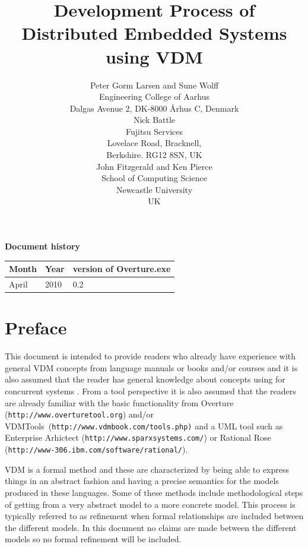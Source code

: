 \documentclass{overturerepchap}
\newcommand{\VDMTools}{VDMTools}
\newcommand{\url}[1]{\texttt{#1}}
\begin{document}
\title{Development Process of Distributed Embedded Systems using VDM}
\author{Peter Gorm Larsen and Sune Wolff \\ 
Engineering College of Aarhus\\
Dalgas Avenue 2, DK-8000 \AA{}rhus C, Denmark\\[3mm]
Nick Battle\\
Fujitsu Services\\
Lovelace Road, Bracknell, \\
Berkshire. RG12 8SN, UK\\[3mm]
John Fitzgerald and Ken Pierce\\
School of Computing Science\\
Newcastle University\\
UK
}


\maketitle


{\textbf{Document history}}

\begin{tabular}{|l|l|l|}\hline
Month   & Year & version of Overture.exe \\ \hline
April   & 2010 & 0.2   \\ \hline
\end{tabular}

\tableofcontents

\chapter*{Preface}

This document is intended to provide readers who already have
experience with general VDM concepts from language manuals
\cite{LangManPP} or books \cite{Fitzgerald&05} and/or courses and it
is also assumed that the reader has general knowledge about concepts
using for concurrent systems
\cite{Ben-Ari82,Hoare85,Chandy&88,Milner89,Lea99}. From a tool perspective
it is also assumed that the readers are already familiar with the
basic functionality from Overture (\url{http://www.overturetool.org}) 
and/or \VDMTools\
(\url{http://www.vdmbook.com/tools.php)} and a UML tool such as
Enterprise Arhictect (\url{http://www.sparxsystems.com/})
or Rational Rose (\url{http://www-306.ibm.com/software/rational/}).

VDM \cite{Jones90a,Dawes91,Fitzgerald&98} is a formal method
\cite{Craigen&93b,Hinchey&95} and these are characterized by being
able to express things in an abstract fashion and having a precise
semantics for the models produced in these languages.  Some of these
methods include methodological steps of getting from a very abstract
model to a more concrete model. This process is typically referred to
as refinement \cite{Jones90a,Morgan90a,Woodcock&96,Back&98} when formal
relationships are included between the different models. In this
document no claims are made between the different models so no formal
refinement will be included.
\end{document}

